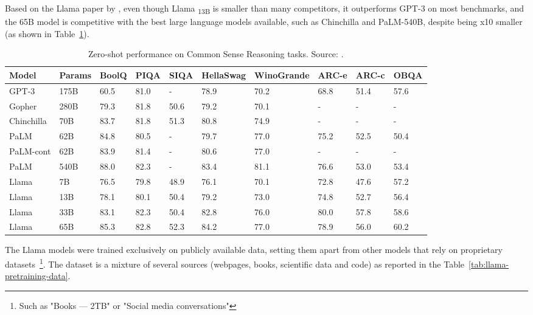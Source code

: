 Based on the Llama paper by \textcite{touvron2023llama}, even though Llama \textsubscript{13B} is smaller than many competitors, it outperforms GPT-3 on most benchmarks, and the 65B model is competitive with the best large language models available, such as Chinchilla and PaLM-540B, despite being x10 smaller (as shown in Table~\ref{tab:llama-zero-shot-performance}).

\begin{table}[htbp]
	\centering
	\scriptsize
	\begin{tabularx}{\textwidth}{@{}lXXXXXXXXX@{}}
		\toprule
		Model      & Params & BoolQ & PIQA & SIQA & HellaSwag & WinoGrande & ARC-e & ARC-c & OBQA \\
		\midrule
		GPT-3      & 175B   & 60.5  & 81.0 & -    & 78.9      & 70.2       & 68.8  & 51.4  & 57.6 \\
		Gopher     & 280B   & 79.3  & 81.8 & 50.6 & 79.2      & 70.1       & -     & -     & -    \\
		Chinchilla & 70B    & 83.7  & 81.8 & 51.3 & 80.8      & 74.9       & -     & -     & -    \\
		PaLM       & 62B    & 84.8  & 80.5 & -    & 79.7      & 77.0       & 75.2  & 52.5  & 50.4 \\
		PaLM-cont  & 62B    & 83.9  & 81.4 & -    & 80.6      & 77.0       & -     & -     & -    \\
		PaLM       & 540B   & 88.0  & 82.3 & -    & 83.4      & 81.1       & 76.6  & 53.0  & 53.4 \\
		\addlinespace
		Llama      & 7B     & 76.5  & 79.8 & 48.9 & 76.1      & 70.1       & 72.8  & 47.6  & 57.2 \\
		Llama      & 13B    & 78.1  & 80.1 & 50.4 & 79.2      & 73.0       & 74.8  & 52.7  & 56.4 \\
		Llama      & 33B    & 83.1  & 82.3 & 50.4 & 82.8      & 76.0       & 80.0  & 57.8  & 58.6 \\
		Llama      & 65B    & 85.3  & 82.8 & 52.3 & 84.2      & 77.0       & 78.9  & 56.0  & 60.2 \\
		\bottomrule
	\end{tabularx}
	\caption{Zero-shot performance on Common Sense Reasoning tasks. Source: \protect\textcite{touvron2023llama}.}
	\label{tab:llama-zero-shot-performance}
\end{table}

The Llama models were trained exclusively on publicly available data, setting them apart from other models that rely on proprietary datasets~\footnote{Such as "Books --- 2TB" or "Social media conversations"}.
The dataset is a mixture of several sources (webpages, books, scientific data and code) as reported in the Table~\ref{tab:llama-pretraining-data}.

